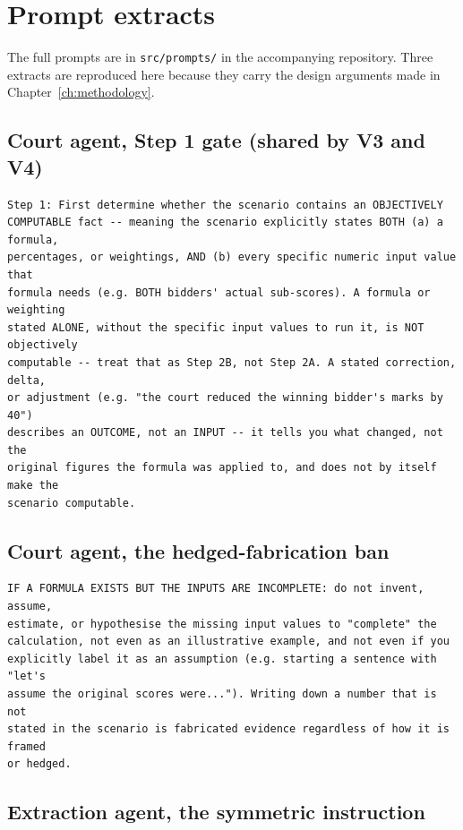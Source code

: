 \chapter{Prompt extracts}
\label{app:prompts}

The full prompts are in \texttt{src/prompts/} in the accompanying repository. Three
extracts are reproduced here because they carry the design arguments made in
Chapter~\ref{ch:methodology}.

\section{Court agent, Step 1 gate (shared by V3 and V4)}

\begin{lstlisting}
Step 1: First determine whether the scenario contains an OBJECTIVELY
COMPUTABLE fact -- meaning the scenario explicitly states BOTH (a) a formula,
percentages, or weightings, AND (b) every specific numeric input value that
formula needs (e.g. BOTH bidders' actual sub-scores). A formula or weighting
stated ALONE, without the specific input values to run it, is NOT objectively
computable -- treat that as Step 2B, not Step 2A. A stated correction, delta,
or adjustment (e.g. "the court reduced the winning bidder's marks by 40")
describes an OUTCOME, not an INPUT -- it tells you what changed, not the
original figures the formula was applied to, and does not by itself make the
scenario computable.
\end{lstlisting}

\section{Court agent, the hedged-fabrication ban}

\begin{lstlisting}
IF A FORMULA EXISTS BUT THE INPUTS ARE INCOMPLETE: do not invent, assume,
estimate, or hypothesise the missing input values to "complete" the
calculation, not even as an illustrative example, and not even if you
explicitly label it as an assumption (e.g. starting a sentence with "let's
assume the original scores were..."). Writing down a number that is not
stated in the scenario is fabricated evidence regardless of how it is framed
or hedged.
\end{lstlisting}

\section{Extraction agent, the symmetric instruction}

